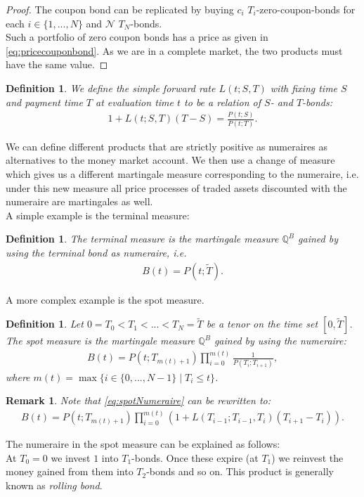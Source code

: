 \documentclass[12pt]{article}
\newtheorem{remark}[theorem]{Remark}
\newtheorem{definition}[theorem]{Definition}
\begin{document}
	\begin{proof}
		The coupon bond can be replicated by buying $c_i$ $T_i$-zero-coupon-bonds for each $i\in \{1, ...,N\}$ and $\mathcal{N}$  $T_N$-bonds.\\
		Such a portfolio of zero coupon bonds has a price as given in \cref{eq:pricecouponbond}. As we are in a complete market, the two products must have the same value.
	\end{proof}
	\begin{definition}\label{def:simpleFR}
		We define the \emph{simple forward rate} $L(t;S,T)$ with fixing time $S$ and payment time $T$ at evaluation time $t$ to be a relation of $S$- and $T$-bonds:
		\begin{align}
			1 + L(t;S,T)(T - S) = \frac{P(t;S)}{P(t;T)}.
		\end{align}
	\end{definition}
	We can define different products that are strictly positive as numeraires as alternatives to the money market account. We then use a change of measure which gives us a different martingale measure corresponding to the numeraire, i.e. under this new measure all price processes of traded assets discounted with the numeraire are martingales as well.\\
	A simple example is the terminal measure:
	\begin{definition}
		The \emph{terminal measure} is the martingale measure $\mathbb{Q}^B$ gained by using the terminal bond as numeraire, i.e. 
		\begin{align}\label{eq:terminalNumeraire}
			B(t) = P(t;\tilde{T}).
		\end{align}
	\end{definition}
	A more complex example is the spot measure.
	\begin{definition}
		Let $0 = T_0 < T_1 < ... < T_N = \tilde{T}$ be a tenor on the time set $[0,\tilde{T}]$.\\
		The \emph{spot measure} is the martingale measure $\mathbb{Q}^B$ gained by using the numeraire:
		\begin{align}\label{eq:spotNumeraire}
			B(t) = P(t;T_{m(t)+1})\prod_{i=0}^{m(t)}\frac{1}{P(T_{i};T_{i+1})},
		\end{align}
		where $m(t) = \max\{i \in \{0, ..., N-1\} \; | \; T_i \le t \}$.
	\end{definition}
	\begin{remark}
		Note that \cref{eq:spotNumeraire} can be rewritten to:
		\begin{align}\label{eq:spotNumeraireAlt}
			B(t) = P(t;T_{m(t)+1})\prod_{i=0}^{m(t)}\left(1 + L\left(T_{i-1};T_{i-1},T_i\right)\left(T_{i+1}-T_i\right)\right).
		\end{align}
	\end{remark}
	The numeraire in the spot measure can be explained as follows:\\
	At $T_0 = 0$ we invest $1$ into $T_1$-bonds. Once these expire (at $T_1$) we reinvest the money gained from them into $T_2$-bonds and so on.
	This product is generally known as \emph{rolling bond}.\\
	
\end{document}
